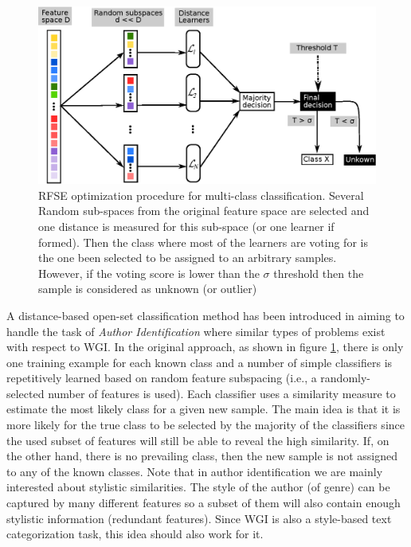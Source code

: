 \begin{figure}[t]
	\begin{center}
    	\includegraphics[scale=0.70]{Figures/RFSE_diagrams.eps}
		\caption{RFSE optimization procedure for multi-class classification. Several Random sub-spaces from the original feature space are selected and one distance is measured for this sub-space (or one learner if formed). Then the class where most of the learners are voting for is the one been selected to be assigned to an arbitrary samples. However, if the voting score is lower than the $\sigma$ threshold then the sample is considered as unknown (or outlier)}
		\label{chap:openset:fig:rfse_single_decision}
	\end{center}
\end{figure}

A distance-based open-set classification method has been introduced in \parencite{koppel2011authorship} aiming to handle the task of \textit{Author Identification} where similar types of problems exist with respect to WGI. In the original approach, as shown in figure \ref{chap:openset:fig:rfse_single_decision}, there is only one training example for each known class and a number of simple classifiers is repetitively learned based on random feature subspacing (i.e., a randomly-selected number of features is used). Each classifier uses a similarity measure to estimate the most likely class for a given new sample. The main idea is that it is more likely for the true class to be selected by the majority of the classifiers since the used subset of features will still be able to reveal the high similarity. If, on the other hand, there is no prevailing class, then the new sample is not assigned to any of the known classes. Note that in author identification we are mainly interested about stylistic similarities. The style of the author (of genre) can be captured by many different features so a subset of them will also contain enough stylistic information (redundant features). Since WGI is also a style-based text categorization task, this idea should also work for it.

